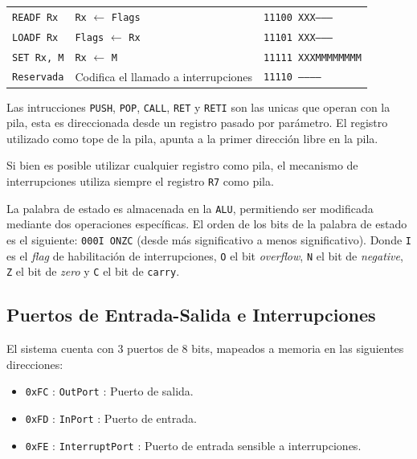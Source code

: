 \documentclass[a4paper,11pt]{article}
\begin{document}
\begin{center}
\begin{tabular}{l|l|l}
\hline
\texttt{READF Rx}      & \texttt{Rx}    $\leftarrow$ \texttt{Flags}                         & \texttt{11100 XXX--------} \\  %
\texttt{LOADF Rx}      & \texttt{Flags} $\leftarrow$ \texttt{Rx}                            & \texttt{11101 XXX--------} \\  %
\hline
\texttt{SET Rx, M}     & \texttt{Rx} $\leftarrow$ \texttt{M}                                & \texttt{11111 XXXMMMMMMMM} \\  %
\hline
\texttt{Reservada}     & Codifica el llamado a interrupciones                               & \texttt{11110 -----------} \\  %
\end{tabular}
\end{center}

Las intrucciones \texttt{PUSH}, \texttt{POP}, \texttt{CALL}, \texttt{RET} y \texttt{RETI} son las unicas que operan con la pila, esta es direccionada desde un registro pasado por parámetro. El registro utilizado como tope de la pila, apunta a la primer dirección libre en la pila.

Si bien es posible utilizar cualquier registro como pila, el mecanismo de interrupciones utiliza siempre el registro \texttt{R7} como pila.

La palabra de estado es almacenada en la \texttt{ALU}, permitiendo ser modificada mediante dos operaciones específicas.
El orden de los bits de la palabra de estado es el siguiente: \texttt{000I ONZC} (desde más significativo a menos significativo).
Donde \texttt{I} es el \emph{flag} de habilitación de interrupciones, \texttt{O} el bit \emph{overflow}, \texttt{N} el bit de \emph{negative}, \texttt{Z} el bit de \emph{zero} y \texttt{C} el bit de \texttt{carry}. 


\subsection*{Puertos de Entrada-Salida e Interrupciones}

\noindent El sistema cuenta con 3 puertos de 8 bits, mapeados a memoria en las siguientes direcciones:

\begin{itemize}
 \setlength\itemsep{0em}
 \item \texttt{0xFC} : \texttt{OutPort} : Puerto de salida.
 \item \texttt{0xFD} : \texttt{InPort} : Puerto de entrada.
 \item \texttt{0xFE} : \texttt{InterruptPort} : Puerto de entrada sensible a interrupciones.
\end{itemize}
\end{document}

